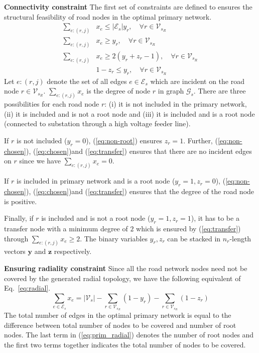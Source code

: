 \documentclass[sigconf]{acmart}
\begin{document}
\noindent\textbf{Connectivity constraint}
The first set of constraints are defined to ensures the structural feasibility of road nodes in the optimal primary network.  
\begin{subequations}
	\begin{align}
		\sum_{e:(r,j)}&x_{e}\leq |\mathcal{E}_s|y_r,\quad \forall r\in\mathcal{V}_{s_R}\label{eq:non-chosen}\\
		\sum_{e:(r,j)}&x_{e}\geq y_r,\quad \forall r\in\mathcal{V}_{s_R}\label{eq:chosen}\\
		\sum_{e:(r,j)}&x_{e}\geq2(y_r+z_r-1),\quad \forall r\in\mathcal{V}_{s_R}\label{eq:transfer}\\
		&1-z_r\leq y_r\label{eq:non-root},\quad \forall r\in\mathcal{V}_{s_R}
	\end{align}
	\label{eq:prim-connectivity}
\end{subequations}
Let $e:(r,j)$ denote the set of all edges $e\in\mathcal{E}_s$ which are incident on the road node $r\in\mathcal{V}_{s_R}$. $\sum_{e:(r,j)}x_{e}$ is the degree of node $r$ in graph $\mathcal{G}_s$. There are three possibilities for each road node $r$: (i) it is not included in the primary network, (ii) it is included and is not a root node and (iii) it is included and is a root node (connected to substation through a high voltage feeder line). 

If $r$ is not included ($y_r=0$), (\ref{eq:non-root}) ensures $z_r=1$. Further, (\ref{eq:non-chosen}), (\ref{eq:chosen})and (\ref{eq:transfer}) ensures that there are no incident edges on $r$ since we have $\sum_{e:(r,j)}x_{e}=0$. 

If $r$ is included in primary network and is a root node ($y_r=1,z_r=0$), (\ref{eq:non-chosen}), (\ref{eq:chosen})and (\ref{eq:transfer}) ensures that the degree of the road node is positive. 

Finally, if $r$ is included and is not a root node ($y_r=1,z_r=1$), it has to be a transfer node with a minimum degree of $2$ which is ensured by (\ref{eq:transfer}) through $\sum_{e:(r,j)}x_{e}\geq2$. The binary variables $y_r,z_r$ can be stacked in $n_r$-length vectors $\mathbf{y}$ and $\mathbf{z}$ respectively.

\noindent\textbf{Ensuring radiality constraint}
Since all the road network nodes need not be covered by the generated radial topology, we have the following equivalent of Eq.~\ref{eq:radial}.
\begin{equation}
	\sum_{e\in\mathcal{E}_s}x_e=|\mathcal{V}_s|-\sum_{r\in\mathcal{V}_{s_R}}(1-y_r)-\sum_{r\in\mathcal{V}_{s_R}}(1-z_r)\label{eq:prim_radial}
\end{equation}
The total number of edges in the optimal primary network is equal to the difference between total number of nodes to be covered and number of root nodes. The last term in (\ref{eq:prim_radial}) denotes the number of root nodes and the first two terms together indicates the total number of nodes to be covered.
\end{document}
